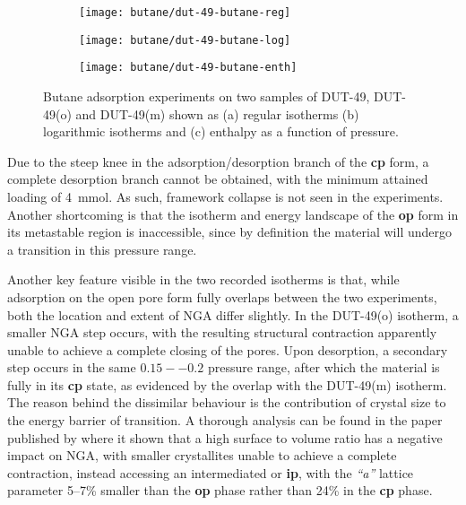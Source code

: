 \begin{figure}[htb]
    \centering
    \begin{subfigure}{0.33\linewidth}
        \texttt{[image: butane/dut-49-butane-reg]}%
        \caption{}\label{dut:fgr:dut-49-butane-reg}
    \end{subfigure}%
    \begin{subfigure}{0.33\linewidth}
        \texttt{[image: butane/dut-49-butane-log]}%
        \caption{}\label{dut:fgr:dut-49-butane-log}
    \end{subfigure}%
    \begin{subfigure}{0.33\linewidth}
        \texttt{[image: butane/dut-49-butane-enth]}%
        \caption{}\label{dut:fgr:dut-49-butane-enth}
    \end{subfigure}%
    \caption{Butane adsorption experiments on two samples of 
    DUT-49, DUT-49(o) and DUT-49(m) shown as (a) regular 
    isotherms (b) logarithmic isotherms 
    and (c) enthalpy as a function of pressure.}%
    \label{dut:fgr:dut-49-butane}
\end{figure}

Due to the steep knee in the adsorption/desorption branch of the 
\textbf{cp} form, a complete desorption branch cannot be obtained,
with the minimum attained loading of \SI{4}{\milli\mol}. As such,
framework collapse is not seen in the experiments. Another 
shortcoming is that the isotherm
and energy landscape of the \textbf{op} form in its metastable 
region is inaccessible, since by definition the material will 
undergo a transition in this pressure range.

Another key feature visible in the two recorded isotherms is that,
while adsorption on the open pore form fully overlaps between the 
two experiments, both the location and extent of NGA differ 
slightly. In the DUT-49(o) isotherm, a smaller NGA step occurs,
with the resulting structural contraction apparently unable to 
achieve a complete closing of the pores. Upon desorption, a 
secondary step occurs in the same \(0.15--0.2\) pressure range,
after which the material is fully in its \textbf{cp} state,
as evidenced by the overlap with the DUT-49(m) isotherm. The 
reason behind the dissimilar behaviour is the contribution
of crystal size to the energy barrier of transition. A thorough
analysis can be found in the paper published 
by \citet{krauseEffectCrystalliteSize2018} where it shown that 
a high surface to volume ratio has a negative impact on NGA, with 
smaller crystallites unable to achieve a complete contraction,
instead accessing an intermediated or \textbf{ip}, with the \textit{``a''}
lattice parameter 5--7\% smaller than the \textbf{op} phase
rather than 24\% in the \textbf{cp} phase.

